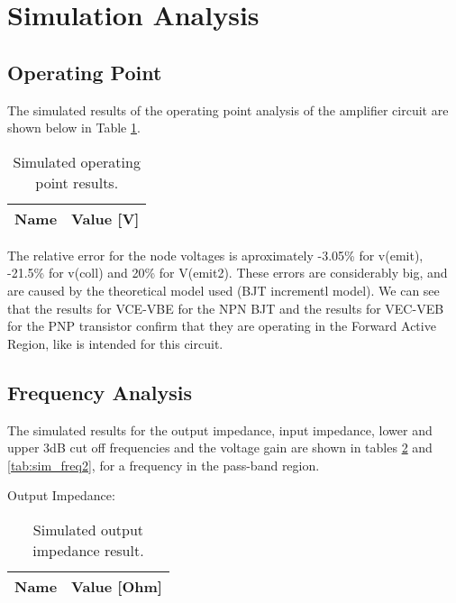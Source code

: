 \section{Simulation Analysis}
\label{sec:simulation}

\subsection{Operating Point}
The simulated results of the operating point analysis of the amplifier circuit are shown below in Table \ref{tab:sim_op}.



\begin{table}[h]
  \centering
  \begin{tabular}{|l|r|}
    \hline    
    {\bf Name} & {\bf Value [V]} \\ \hline
    
  \end{tabular}
  \caption{Simulated operating point results. }
  
  \label{tab:sim_op}
\end{table}


The relative error for the node voltages is aproximately -3.05\% for v(emit), -21.5\% for v(coll) and 20\% for V(emit2). These errors are considerably big, and are caused by the theoretical model used (BJT incrementl model).
We can see that the results for VCE-VBE for the NPN BJT and the results for VEC-VEB for the PNP transistor confirm that they are operating in the Forward Active Region, like is intended for this circuit.

\subsection{Frequency Analysis}
The simulated results for the output impedance, input impedance, lower and upper 3dB cut off frequencies and the voltage gain are shown in tables \ref{tab:sim_freq} and \ref{tab:sim_freq2}, for a frequency in the pass-band region.

Output Impedance:


\begin{table}[h]
  \centering
  \begin{tabular}{|l|r|}
    \hline    
    {\bf Name} & {\bf Value [Ohm]} \\ \hline
    
  \end{tabular}
  \caption{Simulated output impedance result. }
  
  \label{tab:sim_freq}
\end{table}

